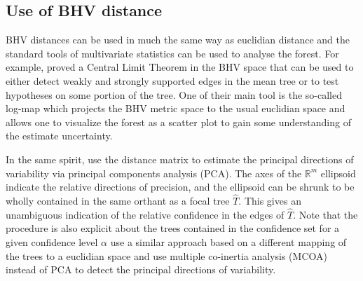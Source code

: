 \subsection{Use of BHV distance} \label{sec:means-and-variance}

BHV distances can be used in much the same way as euclidian distance and the standard tools of multivariate statistics can be used  to analyse the forest. For example, \citet{barden2014limiting} proved a Central Limit Theorem in the BHV space that can be used to either detect weakly and strongly supported edges in the mean tree or to test hypotheses on some portion of the tree. One of their main tool is the so-called log-map which projects the BHV metric space to the usual euclidian space and allows one to visualize the forest as a scatter plot to gain some understanding of the estimate uncertainty. 



In the same spirit, \citet{willis2016confidence} use the distance matrix to 
estimate  the  principal  directions  of  variability  via principal components analysis (PCA). The axes of the $\mathbb{R}^m$ ellipsoid indicate the relative directions of precision, and the ellipsoid can be shrunk  to be wholly contained in the same orthant as a focal tree $\hat{T}$. This gives an unambiguous indication of the relative confidence in the edges of $\hat{T}$. Note that the procedure is also explicit about the trees contained in the confidence set for a given confidence level $\alpha$ \citet{de2012phylo} use a similar approach based on a different mapping of the trees to a euclidian space and use multiple co-inertia analysis (MCOA) instead of PCA to detect the principal directions of variability. 

